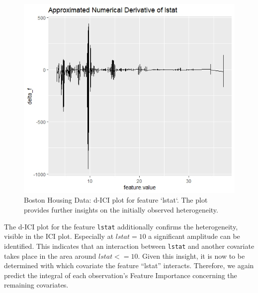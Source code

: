 \documentclass[
]{krantz}
\begin{document}
\begin{figure}

{\centering \includegraphics[width=0.99\linewidth]{images/03-7-RD2} 

}

\caption{Boston Housing Data: d-ICI plot for feature `lstat`. The plot provides further insights on the initially observed heterogeneity.}\label{fig:fig10}
\end{figure}

The d-ICI plot for the feature \texttt{lstat} additionally confirms the heterogeneity, visible in the ICI plot. Especially at \(lstat = 10\) a significant amplitude can be identified. This indicates that an interaction between \texttt{lstat} and another covariate takes place in the area around \(lstat <= 10\). Given this insight, it is now to be determined with which covariate the feature ``lstat'' interacts. Therefore, we again predict the integral of each observation's Feature Importance concerning the remaining covariates.
\end{document}

